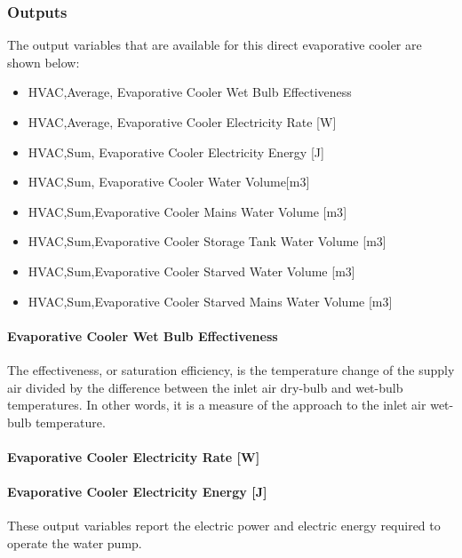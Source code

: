 \subsubsection{Outputs}

The output variables that are available for this direct evaporative cooler are shown below:

\begin{itemize}
\item
  HVAC,Average, Evaporative Cooler Wet Bulb Effectiveness
\item
  HVAC,Average, Evaporative Cooler Electricity Rate {[}W{]}
\item
  HVAC,Sum, Evaporative Cooler Electricity Energy {[}J{]}
\item
  HVAC,Sum, Evaporative Cooler Water Volume{[}m3{]}
\item
  HVAC,Sum,Evaporative Cooler Mains Water Volume {[}m3{]}
\item
  HVAC,Sum,Evaporative Cooler Storage Tank Water Volume {[}m3{]}
\item
  HVAC,Sum,Evaporative Cooler Starved Water Volume {[}m3{]}
\item
  HVAC,Sum,Evaporative Cooler Starved Mains Water Volume {[}m3{]}
\end{itemize}

\paragraph{Evaporative Cooler Wet Bulb Effectiveness}\label{evaporative-cooler-wet-bulb-effectiveness}

The effectiveness, or saturation efficiency, is the temperature change of the supply air divided by the difference between the inlet air dry-bulb and wet-bulb temperatures. In other words, it is a measure of the approach to the inlet air wet-bulb temperature.

\paragraph{Evaporative Cooler Electricity Rate {[}W{]}}\label{evaporative-cooler-electric-powerw}

\paragraph{Evaporative Cooler Electricity Energy {[}J{]}}\label{evaporative-cooler-electric-energy-j}

These output variables report the electric power and electric energy required to operate the water pump.


